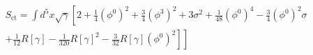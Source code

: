\documentclass{article}
\begin{document}
\[
\begin{array}{l}
S_{\mathrm{ct}}=\int d^{5}x \sqrt{\gamma}\left[2+\frac{1}{ 4}\left(\phi^{0}\right)^{2}+\frac{3}{ 4}\left(\phi^{3}\right)^{2}+3 \sigma^{2}+\frac{1}{48}\left(\phi^{0}\right)^{4}-\frac{3}{ 4}\left(\phi^{0}\right)^{2} \sigma\right. \\
\left.+\frac{1}{12} R[\gamma]-\left.\frac{1}{320} R[\gamma]^{2}-\frac{3 }{ 32} R[\gamma]\left(\phi^{0}\right)^{2}\right]\right]
\end{array}
\]
\end{document}
